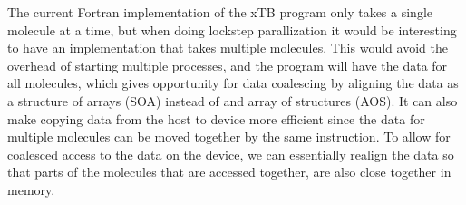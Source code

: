 The current Fortran implementation of the xTB program only takes a single molecule at a time, but when doing lockstep parallization it would be interesting to have an implementation that takes multiple molecules. This would avoid the overhead of starting multiple processes, and the program will have the data for all molecules, which gives opportunity for data coalescing by aligning the data as a structure of arrays (SOA) instead of and array of structures (AOS). It can also make copying data from the host to device more efficient since the data for multiple molecules can be moved together by the same instruction. To allow for coalesced access to the data on the device, we can essentially realign the data so that parts of the molecules that are accessed together, are also close together in memory.%

